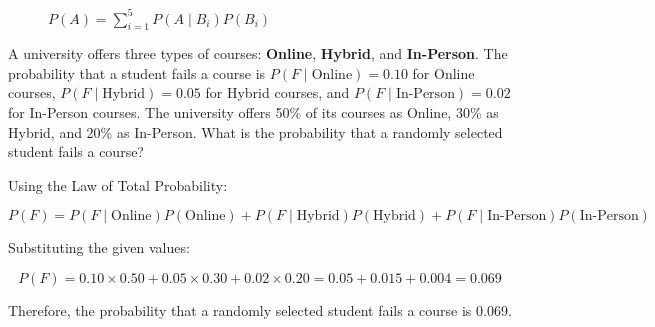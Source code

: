 \begin{figure}[htbp]
    \centering
    \caption{$P(A) = \sum_{i=1}^{5} P(A \mid B_i) P(B_i)$}
    \label{fig:decoAmulB}
\end{figure}

\begin{example}
    A university offers three types of courses: \textbf{Online}, \textbf{Hybrid}, and \textbf{In-Person}. The probability that a student fails a course is \( P(F \mid \text{Online}) = 0.10 \) for Online courses, \( P(F \mid \text{Hybrid}) = 0.05 \) for Hybrid courses, and \( P(F \mid \text{In-Person}) = 0.02 \) for In-Person courses. The university offers 50\% of its courses as Online, 30\% as Hybrid, and 20\% as In-Person. What is the probability that a randomly selected student fails a course?
\end{example}

\begin{solution}
    Using the Law of Total Probability:

    \[
    P(F) = P(F \mid \text{Online}) P(\text{Online}) + P(F \mid \text{Hybrid}) P(\text{Hybrid}) + P(F \mid \text{In-Person}) P(\text{In-Person})
    \]

    Substituting the given values:

    \[
    P(F) = 0.10 \times 0.50 + 0.05 \times 0.30 + 0.02 \times 0.20 = 0.05 + 0.015 + 0.004 = 0.069
    \]

    Therefore, the probability that a randomly selected student fails a course is 0.069.
\end{solution}

